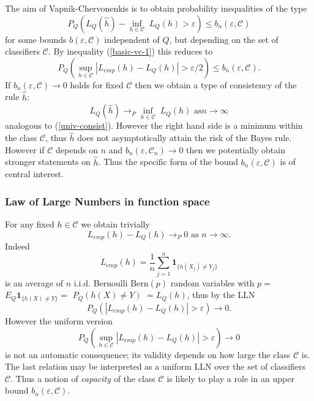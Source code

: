 \documentclass[11pt,twoside]{article}%
\theoremstyle{change}
\begin{document}
\bigskip\bigskip The aim of Vapnik-Chervonenkis is to obtain probability
inequalities of the type
\[
P_{Q}\left(  L_{Q}(\hat{h})-\inf_{h\in\mathcal{C}}\;L_{Q}(h)>\varepsilon
\right)  \leq b_{n}(\varepsilon,\mathcal{C})
\]
for some bounds $b(\varepsilon,\mathcal{C})$ independent of $Q$, but depending
on the set of classifiers $\mathcal{C}$. By inequality (\ref{basic-vc-1}) this
reduces to
\[
P_{Q}\left(  \sup_{h\in\mathcal{C}}\left\vert L_{emp}(h)-L_{Q}(h)\right\vert
>\varepsilon/2\right)  \leq b_{n}(\varepsilon,\mathcal{C}).
\]
If $b_{n}(\varepsilon,\mathcal{C})\rightarrow0$ holds for fixed $\mathcal{C}$
then we obtain a type of consistency of the rule $\hat{h}$:
\[
L_{Q}(\hat{h})\rightarrow_{P}\inf_{h\in\mathcal{C}}\;L_{Q}(h)\text{ as
}n\rightarrow\infty
\]
analogous to (\ref{univ-consist}). However the right hand side is a minimum
within the class $\mathcal{C}$, thus $\hat{h}$ does not asymptotically attain
the risk of the Bayes rule. However if $\mathcal{C}$ depends on $n$ and
$b_{n}(\varepsilon,\mathcal{C}_{n})\rightarrow0$ then we potentially obtain
stronger statements on $\hat{h}$. Thus the specific form of the bound
$b_{n}(\varepsilon,\mathcal{C})$ is of central interest.

\subsubsection{Law of Large Numbers in function space}

For any fixed $h\in\mathcal{C}$ we obtain trivially
\[
L_{emp}(h)-L_{Q}(h)\rightarrow_{P}0\text{ as }n\rightarrow\infty.
\]
Indeed
\[
L_{emp}(h)=\frac{1}{n}\sum_{j=1}^{n}\mathbf{1}_{\{h(X_{j})\neq Y_{j}\}}%
\]
is an average of $n$ i.i.d. Bernoulli $\mathrm{Bern}(p)$ random variables with
$p=$ $E_{Q}\mathbf{1}_{\{h(X)\neq Y\}}=$ $P_{Q}\left(  h(X)\neq Y\right)  $
$=L_{Q}(h)$, thus by the LLN
\begin{equation}
P_{Q}\left(  \left\vert L_{emp}(h)-L_{Q}(h)\right\vert >\varepsilon\right)
\rightarrow0.\label{LLN-onerule}%
\end{equation}
However the uniform version
\begin{equation}
P_{Q}\left(  \sup_{h\in\mathcal{C}}\left\vert L_{emp}(h)-L_{Q}(h)\right\vert
>\varepsilon\right)  \rightarrow0\label{uniform-LLN}%
\end{equation}
is not an automatic consequence; its validity depends on how large the class
$\mathcal{C}$ is. The last relation may be interpreted as a uniform LLN over
the set of classifiers $\mathcal{C}$. Thus a notion of \textit{capacity} of
the class $\mathcal{C}$ is likely to play a role in an upper bound
$b_{n}(\varepsilon,\mathcal{C})$.
\end{document}
